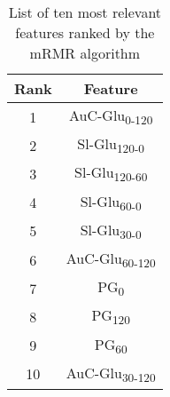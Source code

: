 \documentclass[journal,comsoc]{IEEEtran}
\renewcommand{\^}{\hat}  %
\begin{document}
%
\begin{table}[!h]
  \centering
  \renewcommand{\arraystretch}{1.3}
  \caption{List of ten most relevant features ranked by the mRMR algorithm}
  \centering
  \begin{tabular}{c c}
    \toprule
    Rank &  Feature\\
    \midrule \midrule
    1 & AuC-Glu\textsubscript{0-120}\\
    2 & Sl-Glu\textsubscript{120-0}\\
    3 & Sl-Glu\textsubscript{120-60}\\
    4 & Sl-Glu\textsubscript{60-0}\\
    5 & Sl-Glu\textsubscript{30-0}\\
    6 & AuC-Glu\textsubscript{60-120}\\
    7 & PG\textsubscript{0}\\
    8 & PG\textsubscript{120}\\
    9 & PG\textsubscript{60} \\
    10 & AuC-Glu\textsubscript{30-120}\\
    \bottomrule
  \end{tabular}
  \label{tab:ranked}
\end{table}
%
\end{document}
